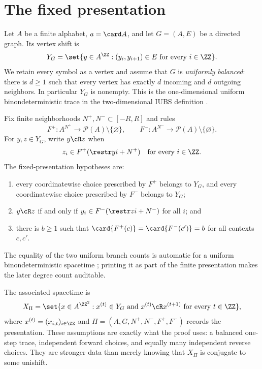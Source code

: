 \section{The fixed presentation}\label{sec:presentation}

Let $A$ be a finite alphabet, $a=\card A$, and let
$G=(A,E)$ be a directed graph.  Its vertex shift is
\[
 Y_G=\set{y\in A^{\ZZ}:(y_i,y_{i+1})\in E\text{ for every }i\in\ZZ}.
\]
We retain every symbol as a vertex and assume that $G$ is \emph{uniformly balanced}: there is $d\geq1$ such that every vertex has exactly $d$ incoming and $d$ outgoing neighbors.  In particular $Y_G$ is nonempty.  This is the one-dimensional uniform binondeterministic trace in the two-dimensional IUBS definition \citep[Definitions~8--9]{salo2025iubs}.

Fix finite neighborhoods $N^+,N^-\subset[-R,R]$ and rules
\[
 F^+:A^{N^+}\longrightarrow\mathcal P(A)\setminus\{\varnothing\},
 \qquad
 F^-:A^{N^-}\longrightarrow\mathcal P(A)\setminus\{\varnothing\}.
\]
For $y,z\in Y_G$, write $y\cR z$ when
\begin{equation}\label{eq:forward-relation}
 z_i\in F^+(\restr y{i+N^+})\quad\text{for every }i\in\ZZ.
\end{equation}
The fixed-presentation hypotheses are:
\begin{enumerate}
\item every coordinatewise choice prescribed by $F^+$ belongs to $Y_G$, and every coordinatewise choice prescribed by $F^-$ belongs to $Y_G$;
\item $y\cR z$ if and only if
      $y_i\in F^-(\restr z{i+N^-})$ for all $i$; and
\item there is $b\geq1$ such that $\card{F^+(c)}=\card{F^-(c')}=b$ for all contexts $c,c'$.
\end{enumerate}
The equality of the two uniform branch counts is automatic for a uniform binondeterministic spacetime \citep[after Lemma~23]{salo2025iubs}; printing it as part of the finite presentation makes the later degree count auditable.

The associated spacetime is
\begin{equation}\label{eq:X}
 X_\Pi=\set{x\in A^{\ZZ^2}:x^{(t)}\in Y_G
             \text{ and }x^{(t)}\cR x^{(t+1)}
             \text{ for every }t\in\ZZ},
\end{equation}
where $x^{(t)}=(x_{i,t})_{i\in\ZZ}$ and
$\Pi=(A,G,N^+,N^-,F^+,F^-)$ records the presentation.  These assumptions are exactly what the proof uses: a balanced one-step trace, independent forward choices, and equally many independent reverse choices.  They are stronger data than merely knowing that $X_\Pi$ is conjugate to some unishift.

